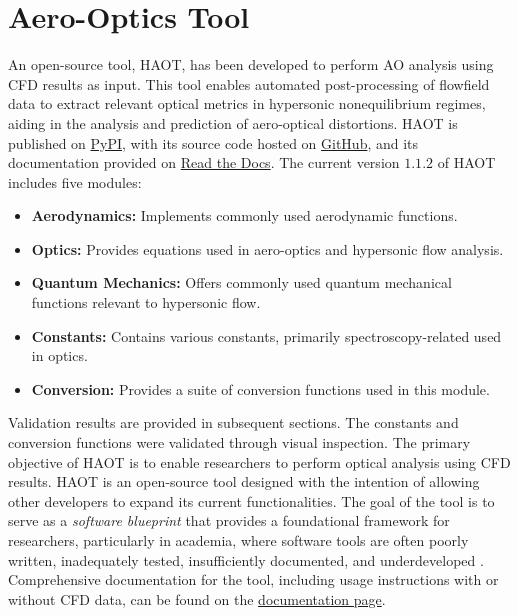 \chapter{Aero-Optics Tool\label{ch:ch4}}
An open-source tool, \gls{HAOT}, has been developed to perform \gls{AO}
analysis using \gls{CFD} results as input. This tool enables automated
post-processing of flowfield data to extract relevant optical metrics in
hypersonic nonequilibrium regimes, aiding in the analysis and prediction of
aero-optical distortions. \gls{HAOT} is published on
\href{https://pypi.org/project/haot/}{PyPI}, with its source code hosted on
\href{https://github.com/mliza/HAOT}{GitHub}, and its documentation provided on
\href{https://haot.readthedocs.io/en/latest/}{Read the Docs}. The current
version $1.1.2$ of \gls{HAOT} includes five modules:
\begin{itemize} 
\item \textbf{Aerodynamics:} Implements commonly used aerodynamic functions.
\item \textbf{Optics:} Provides equations used in aero-optics and hypersonic
    flow analysis.
\item \textbf{Quantum Mechanics:} Offers commonly used quantum mechanical
    functions relevant to hypersonic flow.
\item \textbf{Constants:} Contains various constants, primarily
    spectroscopy-related used in optics.
\item \textbf{Conversion:} Provides a suite of conversion functions used in
    this module. 
\end{itemize}

Validation results are provided in subsequent sections. The constants and
conversion functions were validated through visual inspection. The primary
objective of \gls{HAOT} is to enable researchers to perform optical analysis
using \gls{CFD} results. \gls{HAOT} is an open-source tool designed with the
intention of allowing other developers to expand its current functionalities.
The goal of the tool is to serve as a \textit{software blueprint} that provides
a foundational framework for researchers, particularly in academia, where
software tools are often poorly written, inadequately tested, insufficiently
documented, and underdeveloped \cite{Robillard1998,Liu2008}. Comprehensive
documentation for the tool, including usage instructions with or without
\gls{CFD} data, can be found on the
\href{https://haot.readthedocs.io/en/latest/}{documentation page}. \\

